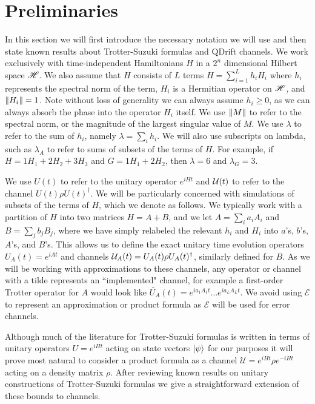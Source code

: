 \section{Preliminaries} \label{sec:composite_prelim}
In this section we will first introduce the necessary notation we will use and then state known results about Trotter-Suzuki formulas and QDrift
channels. We work exclusively with time-independent Hamiltonians $H$ in a $2^n$ dimensional Hilbert space $\mathscr{H}$. We also assume that $H$
consists of $L$ terms $H = \sum_{i = 1}^L h_i H_i$ where $h_i$ represents the spectral norm of the term, $H_i$ is a Hermitian operator on $\mathscr{H}$, and $\norm{H_i} = 1$. Note without loss of generality we can always assume $h_i \geq 0$, as we can always absorb the phase into the 
operator $H_i$ itself. We use $\norm{M}$ to refer to the spectral norm, or the magnitude of the largest singular value of $M$. We use $\lambda$ to refer to the sum of $h_i$, namely $\lambda = \sum_i h_i$. We will also use subscripts on lambda, such as $\lambda_A$ to refer to sums of subsets of the terms of $H$. For example, if $H = 1 H_1 + 2 H_2 + 3 H_3$ and $G = 1 H_1 + 2 H_2$, then $\lambda = 6$ and $\lambda_G = 3$. 

We use $U(t)$ to refer to the unitary operator $e^{iHt}$ and $\mathcal{U}(t)$ to refer to the channel $U(t) \rho U(t)^\dagger$. We will be particularly
concerned with simulations of subsets of the terms of $H$, which we denote as follows. We typically work with a partition of $H$ into two matrices
$H = A + B$, and we let $A = \sum_i a_i A_i$ and $B = \sum_j b_j B_j$, where we have simply relabeled the relevant $h_i$ and $H_i$ into $a$'s, $b$'s, $A$'s, and $B$'s. This allows us to define the exact unitary time evolution operators $U_A(t) = e^{i A t}$ and channels $\mathcal{U}_A(t) = U_A(t) \rho U_A(t)^\dagger$, similarly defined for $B$. As we will be working with approximations to these channels, any operator or channel with a tilde represents
an ``implemented" channel, for example a first-order Trotter operator for $A$ would look like $\widetilde{U_A}(t) = e^{i a_1 A_1 t} \ldots e^{i a_L A_L t}$. We avoid using $\mathcal{E}$ to represent an approximation or product formula as $\mathcal{E}$ will be used for error channels.

Although much of the literature for Trotter-Suzuki formulas is written in terms of unitary operators $U = e^{i H t}$ acting on state vectors $\ket{\psi}$ for our purposes it will prove most natural to consider a product formula as a channel $\mathcal{U} = e^{iHt} \rho e^{-iHt}$ acting on a density matrix $\rho$. After reviewing known results on unitary constructions of Trotter-Suzuki formulas we give a straightforward extension
of these bounds to channels. 


